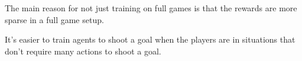 The main reason for not just training on full games is that the rewards are more sparse in a full game setup.

It's easier to train agents to shoot a goal when the players are in situations that don't require many actions to shoot a goal.

